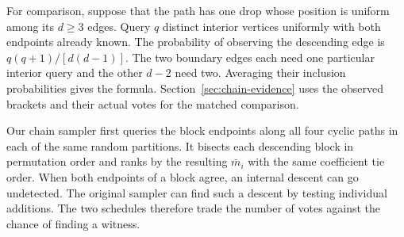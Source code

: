 For comparison, suppose that the path has one drop whose position is
uniform among its $d\ge3$ edges. Query $q$ distinct interior vertices
uniformly with both endpoints already known. The probability of observing
the descending edge is $q(q+1)/[d(d-1)]$. The two boundary edges each
need one particular interior query and the other $d-2$ need two. Averaging
their inclusion probabilities gives the formula. Section~\ref{sec:chain-evidence}
uses the observed brackets and their actual votes for the matched comparison.

Our chain sampler first queries the block endpoints along all four cyclic paths
in each of the same random partitions. It bisects each descending block in
permutation order and ranks by the resulting $\bar m_i$ with the same coefficient
tie order. When both endpoints of a block agree, an internal descent can go
undetected. The original sampler can find such a descent by testing individual
additions. The two schedules therefore trade the number of votes against the
chance of finding a witness.
